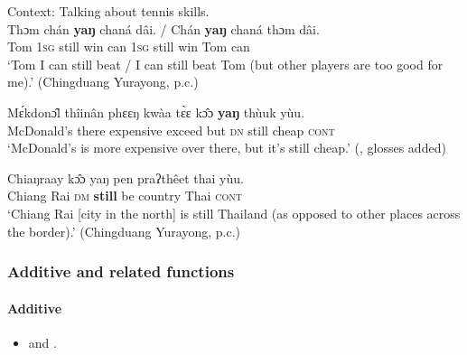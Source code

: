 \begin{exe}
	\ex\label{exAppendixThaiMarginal1}
	 Context: Talking about tennis skills.\\
	\gll Thɔm		chán		\textbf{yaŋ}		chaná		dâi.	/ Chán		\textbf{yaŋ}		chaná	thɔm			dâi.\\
	Tom 1\textsc{sg} still win can {} 1\textsc{sg} still win Tom can\\	
	\glt \lq Tom I can still beat / I can still beat Tom (but other players are too good for me).' (Chingduang Yurayong, p.c.)

	\ex\label{exAppendixThaiMarginal2}
	\gll Mɛ́kdonɔ̂l		thîinân	phɛɛŋ		kwàa		tɛ̀ɛ	kɔ̂ɔ	\textbf{yaŋ}	thùuk		yùu.\\
McDonald’s	there		expensive	exceed	but	\textsc{dn}	still	cheap		\textsc{cont}\\
	\glt \lq McDonald\rq{}s is more expensive over there, but it\rq{}s still cheap.\rq{ }(\cite[106]{HigbieThinsan2002}, glosses added)

	\ex\label{exAppendixThaiMarginal3}
	\gll Chiaŋraay		kɔ̂ɔ	yaŋ	pen	praʔthêet	thai	yùu.\\
{Chiang Rai} \textsc{dm} \textbf{still} be country Thai \textsc{cont}\\
	\glt \lq Chiang Rai [city in the north] is still Thailand (as opposed to other places across the border).' (Chingduang Yurayong, p.c.)
\end{exe}

\subsubsection{Additive and related functions}

\paragraph{Additive}\label{appendixThaiAdditive}
\begin{itemize}
	\item \textcite[122]{Smyth2002} and \textcite[147]{HigbieThinsan2002}.
\end{itemize}
	
